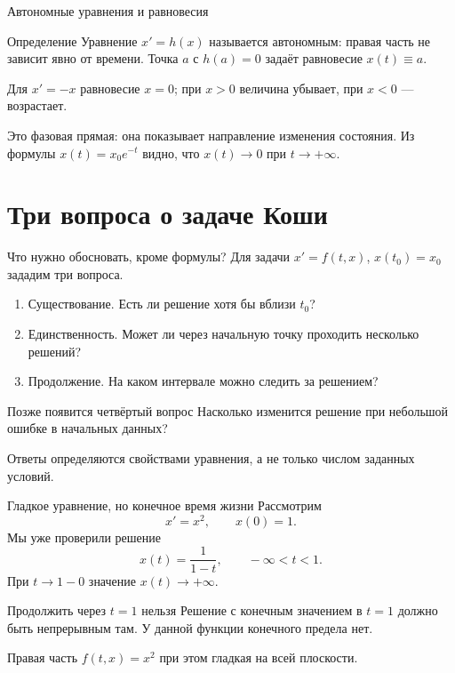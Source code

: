 \documentclass[aspectratio=169,11pt]{beamer}
\begin{document}
\begin{frame}{Автономные уравнения и равновесия}
  \begin{block}{Определение}
    Уравнение $x'=h(x)$ называется \alert{автономным}:
    правая часть не зависит явно от времени.
    Точка $a$ с $h(a)=0$ задаёт \alert{равновесие} $x(t)\equiv a$.
  \end{block}
  Для $x'=-x$ равновесие $x=0$; при $x>0$ величина убывает,
  при $x<0$ --- возрастает.
  \begin{center}
  \end{center}
  Это \alert{фазовая прямая}: она показывает направление изменения состояния.
  Из формулы $x(t)=x_0e^{-t}$ видно, что $x(t)\to0$ при $t\to+\infty$.
\end{frame}

\section{Три вопроса о задаче Коши}
\begin{frame}{Что нужно обосновать, кроме формулы?}
  Для задачи $x'=f(t,x)$, $x(t_0)=x_0$ зададим три вопроса.
  \begin{enumerate}
    \item \alert{Существование.} Есть ли решение хотя бы вблизи $t_0$?
    \item \alert{Единственность.} Может ли через начальную точку
      проходить несколько решений?
    \item \alert{Продолжение.} На каком интервале можно следить за решением?
  \end{enumerate}
  \begin{block}{Позже появится четвёртый вопрос}
    Насколько изменится решение при небольшой ошибке в начальных данных?
  \end{block}
  Ответы определяются свойствами уравнения, а не только числом заданных условий.
\end{frame}

\begin{frame}{Гладкое уравнение, но конечное время жизни}
  Рассмотрим
  \[
    x'=x^2,\qquad x(0)=1.
  \]
  Мы уже проверили решение
  \[
    x(t)=\frac{1}{1-t},\qquad -\infty<t<1.
  \]
  При $t\to1-0$ значение $x(t)\to+\infty$.
  \begin{alertblock}{Продолжить через $t=1$ нельзя}
    Решение с конечным значением в $t=1$ должно быть непрерывным там.
    У данной функции конечного предела нет.
  \end{alertblock}
  Правая часть $f(t,x)=x^2$ при этом гладкая на всей плоскости.
\end{frame}
\end{document}

